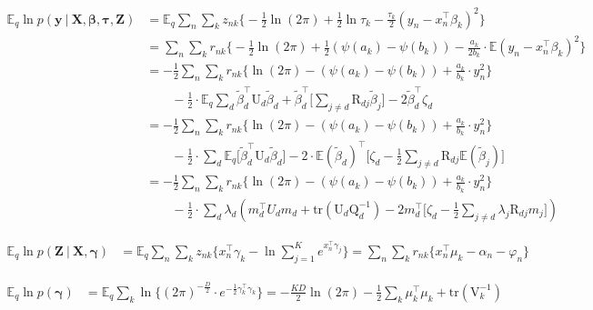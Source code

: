 \documentclass[twoside,11pt]{article}
\newcommand\given[1][]{\:#1\vert\:}
\newcommand{\transpose}[1]{#1^{\intercal}}
\newcommand{\nsum}{\sum\limits_{n}}
\newcommand{\ksum}{\sum\limits_{k}}
\newcommand{\boldbeta}{\boldsymbol\beta}
\newcommand{\boldgamma}{\boldsymbol\gamma}
\newcommand{\boldtau}{\boldsymbol\tau}
\newcommand{\E}{\mathbb{E}}
\newcommand{\betad}{\tilde{\beta}_d}
\newcommand{\trace}[1]{\mathrm{tr} \left( #1 \right)}
\begin{document}
\begin{align*}
	\E_q \ln p\left( \mathbf{y} \given \mathbf{X}, \boldbeta, \boldtau, \mathbf{Z} \right) &= 
	\E_q \nsum \ksum z_{nk} \Big\{ - \frac{1}{2} \ln(2\pi) + \frac{1}{2} \ln \tau_k - \frac{\tau_k}{2}(y_n - \transpose{x_n} \beta_k)^2\Big\} \\
	&= \nsum \ksum r_{nk} \Big\{ - \frac{1}{2} \ln(2\pi) + \frac{1}{2} (\psi(a_k) - \psi(b_k)) - \frac{a_k}{2b_k} \cdot \E(y_n - \transpose{x_n} \beta_k)^2\Big\} \\
	&= - \frac{1}{2} \nsum \ksum r_{nk} \Big\{  \ln(2\pi) - (\psi(a_k) - \psi(b_k)) + \frac{a_k}{b_k} \cdot y_n^2 \Big\} \\ & \qquad -\frac{1}{2} \cdot \E_q \sum_d \transpose{\betad} \mathrm{U}_d \betad + \transpose{\betad} \Bigg[\sum_{j \neq d} \mathrm{R}_{dj} \tilde{\beta}_j \Bigg] - 2 \transpose{\betad} \zeta_d \\
	&= - \frac{1}{2} \nsum \ksum r_{nk} \Big\{  \ln(2\pi) - (\psi(a_k) - \psi(b_k)) + \frac{a_k}{b_k} \cdot y_n^2 \Big\} \\ & \qquad -\frac{1}{2} \cdot \sum_d \E_q \Big[ \transpose{\betad} \mathrm{U}_d \betad \Big] - 2 \cdot \transpose{\E\left(\betad\right)} \Bigg[ \zeta_d - \frac{1}{2} \sum_{j \neq d} \mathrm{R}_{dj} \E\left(\tilde{\beta}_j\right) \Bigg] \\
	&= - \frac{1}{2} \nsum \ksum r_{nk} \Big\{  \ln(2\pi) - (\psi(a_k) - \psi(b_k)) + \frac{a_k}{b_k} \cdot y_n^2 \Big\} \\ & \qquad - \frac{1}{2} \cdot \sum_d \lambda_d \left( \transpose{m_d} U_d m_d + \trace{\mathrm{U}_d \mathrm{Q}_d^{-1}} - 2\transpose{m_d} \Bigg[ \zeta_d - \frac{1}{2} \sum_{j\neq d} \lambda_j \mathrm{R}_{dj} m_j\Bigg] \right)
\end{align*}

\begin{align*}
	\E_q \ln p\left( \mathbf{Z} \given \mathbf{X}, \boldgamma \right) &= \E_q \nsum \ksum z_{nk} \Big\{ \transpose{x_n} \gamma_k - \ln \sum_{j=1}^K e^{\transpose{x_n}\gamma_j}\Big\} = \nsum \ksum r_{nk} \Big\{ \transpose{x_n} \mu_k - \alpha_n - \varphi_n \Big\}
\end{align*}

\begin{align*}
	\E_q \ln p\left( \boldgamma \right) &= \E_q \ksum  \ln \Big\{ (2\pi)^{-\frac{D}{2}} \cdot e^{-\frac{1}{2} \transpose{\gamma_k}\gamma_k}\Big\} = -\frac{KD}{2} \ln(2\pi) - \frac{1}{2} \ksum \transpose{\mu_k} \mu_k + \trace{\mathrm{V}_k^{-1}} 
\end{align*}
\end{document}
